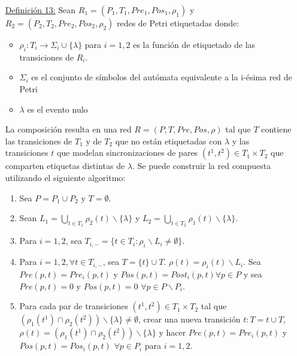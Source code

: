 \begin{itemize}
  \item [\underline{Definición 13:}] Sean $R_{1} = (P_{1}, T_{1}, Pre_{1},
  Pos_{1}, \rho_{1})$ y $R_{2} = (P_{2}, T_{2}, Pre_{2}, Pos_{2}, \rho_{2})$
  redes de Petri etiquetadas donde:
  \begin{itemize}
    \item $\rho_{i} : T_{i} \rightarrow \Sigma_{i} \cup \{ \lambda \}$ para $i =
    1, 2$ es la función de etiquetado de las transiciones de $R_{i}$.
    \item $ \Sigma_{i} $ es el conjunto de símbolos del autómata equivalente a
    la i-ésima red de Petri
    \item $\lambda$ es el evento nulo
  \end{itemize} 
  La composición resulta en una red $R = (P, T, Pre, Pos, \rho)$ tal que $T$
  contiene las transiciones de $T_{1}$ y de $T_{2}$ que no están etiquetadas con
  $\lambda$ y las transiciones $t$ que modelan sincronizaciones de pares
  $(t^{1}, t^{2}) \in T_{1} \times T_{2}$ que comparten etiquetas distintas de
  $\lambda$.
  Se puede construir la red compuesta utilizando el siguiente algoritmo:
  \begin{enumerate}
    \item Sea $P = P_{1} \cup P_{2} $ y $T = \emptyset$.
    \item Sean $L_{1} = \bigcup_{t \in T_{1}} \rho_{2}(t) \backslash
    \{\lambda\}$ y $L_{2} = \bigcup_{t \in T_{2}} \rho_{1}(t) \backslash
    \{\lambda\}$.
    \item Para $i = 1, 2$, sea $T_{i,-} = \{ t \in T_{i}: \rho_{i} \backslash
    L_{i} \not = \emptyset \}$.
    \item Para $i = 1, 2, \forall t \in T_{i,-}$, sea $T = \{t\} \cup T$.
    $\rho(t) = \rho_{i}(t) \backslash L_{i}$. Sea $Pre(p, t) = Pre_{i}(p, t)$ y $Pos(p,
    t) = Post_{i}(p, t) \forall p \in P$ y sea $ Pre(p, t) = 0 $ y $ Pos(p,t) =
    0$ $\forall p \in P \backslash P_{i}$.
    \item Para cada par de transiciones $(t^{1}, t^{2}) \in T_{1} \times T_{2}$
    tal que $(\rho_{1}(t^{1}) \cap \rho_{2}(t^{2})) \backslash \{\lambda\} \not
    = \emptyset$, crear una nueva transición $t : T = {t} \cup T$, $\rho(t) =
    (\rho_{1}(t^{1}) \cap \rho_{2}(t^{2})) \backslash \{\lambda\}$ y hacer
    $Pre(p, t) = Pre_{i}(p,t)$ y $Pos(p, t) = Pos_{i}(p,t)$ $\forall p \in
    P_{i}$ para $i = 1, 2$.
  \end{enumerate}
\end{itemize}

